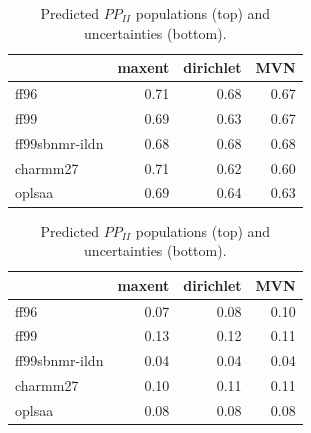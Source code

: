 \documentclass[12pt]{article}
\begin{document}
\clearpage

\begin{table}

\begin{tabular}{lrrr}
\toprule
{} &  maxent &  dirichlet &  MVN \\
\midrule
ff96           &    0.71 &       0.68 & 0.67 \\
ff99           &    0.69 &       0.63 & 0.67 \\
ff99sbnmr-ildn &    0.68 &       0.68 & 0.68 \\
charmm27          &    0.71 &       0.62 & 0.60 \\
oplsaa            &    0.69 &       0.64 & 0.63 \\
\bottomrule
\end{tabular}


\begin{tabular}{lrrr}
\toprule
{} &  maxent &  dirichlet &  MVN \\
\midrule
ff96           &    0.07 &       0.08 & 0.10 \\
ff99           &    0.13 &       0.12 & 0.11 \\
ff99sbnmr-ildn &    0.04 &       0.04 & 0.04 \\
charmm27          &    0.10 &       0.11 & 0.11 \\
oplsaa            &    0.08 &       0.08 & 0.08 \\
\bottomrule
\end{tabular}

\caption{
Predicted $PP_{II}$ populations (top) and uncertainties (bottom).  
}
\end{table}

\clearpage
\end{document}
